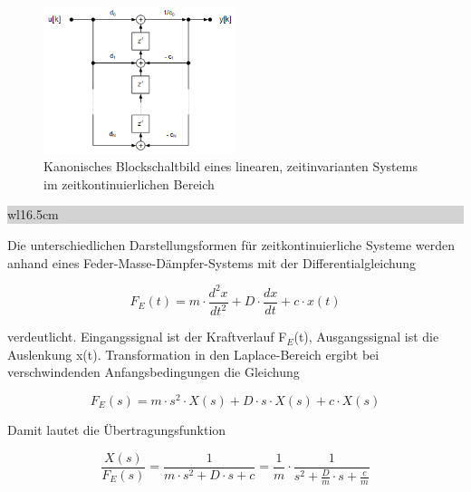 \begin{figure}[H]
  \centerline{\includegraphics[width=0.5\textwidth]{Kapitel6/Bilder/image5.png}}
  \caption{Kanonisches Blockschaltbild eines linearen, zeitinvarianten Systems im zeitkontinuierlichen Bereich}
  \label{fig:AGAIN}
\end{figure} \bigskip

\noindent
\colorbox{lightgray}{%
%
\renewcommand\arraystretch{0.6}%
\begin{tabular}{ wl{16.5cm} }
{}
\end{tabular}%
}\medskip

\noindent Die unterschiedlichen Darstellungsformen f\"{u}r zeitkontinuierliche Systeme werden anhand eines Feder-Masse-D\"{a}mpfer-Systems mit der Differentialgleichung 

\begin{equation}\label{eq:sixsixtyeight}
F_{E} \left(t\right)=m\cdot \frac{d^{2} x}{dt^{2} } +D\cdot \frac{dx}{dt} +c\cdot x\left(t\right)
\end{equation}

\noindent verdeutlicht. Eingangssignal ist der Kraftverlauf F${}_{E}$(t), Ausgangssignal ist die Auslenkung x(t). Transformation in den Laplace-Bereich ergibt bei verschwindenden Anfangsbedingungen die Gleichung

\begin{equation}\label{eq:sixsixtynine}
F_{E} \left(s\right)=m\cdot s^{2} \cdot X\left(s\right)+D\cdot s\cdot X\left(s\right)+c\cdot X\left(s\right)
\end{equation}

\noindent Damit lautet die \"{U}bertragungsfunktion

\begin{equation}\label{eq:sixseventy}
\frac{X\left(s\right)}{F_{E} \left(s\right)} =\frac{1}{m\cdot s^{2} +D\cdot s+c} =\frac{1}{m} \cdot \frac{1}{s^{2} +\frac{D}{m} \cdot s+\frac{c}{m} }
\end{equation}

